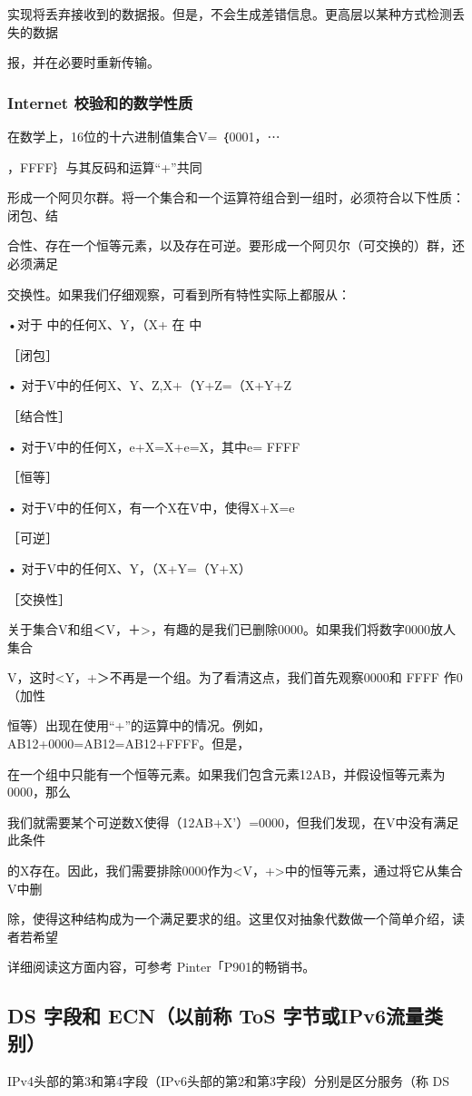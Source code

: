 实现将丢弃接收到的数据报。但是，不会生成差错信息。更高层以某种方式检测丢失的数据

报，并在必要时重新传输。

\subsubsection{Internet 校验和的数学性质}
在数学上，16位的十六进制值集合V= ｛0001，⋯

，FFFF｝与其反码和运算“+”共同

形成一个阿贝尔群。将一个集合和一个运算符组合到一组时，必须符合以下性质：闭包、结

合性、存在一个恒等元素，以及存在可逆。要形成一个阿贝尔（可交换的）群，还必须满足

交换性。如果我们仔细观察，可看到所有特性实际上都服从：

•对于 中的任何X、Y，（X+ 在 中

［闭包］

• 对于V中的任何X、Y、Z,X+（Y+Z=（X+Y+Z

［结合性］

• 对于V中的任何X，e+X=X+e=X，其中e= FFFF

［恒等］

• 对于V中的任何X，有一个X在V中，使得X+X=e

［可逆］

• 对于V中的任何X、Y，（X+Y=（Y+X）

［交换性］

关于集合V和组＜V，＋>，有趣的是我们已删除0000。如果我们将数字0000放人集合

V，这时<Y，+＞不再是一个组。为了看清这点，我们首先观察0000和 FFFF 作0（加性

恒等）出现在使用“+”的运算中的情况。例如，AB12+0000=AB12=AB12+FFFF。但是，

在一个组中只能有一个恒等元素。如果我们包含元素12AB，并假设恒等元素为0000，那么

我们就需要某个可逆数X使得（12AB+X'）=0000，但我们发现，在V中没有满足此条件

的X存在。因此，我们需要排除0000作为<V，+>中的恒等元素，通过将它从集合V中删

除，使得这种结构成为一个满足要求的组。这里仅对抽象代数做一个简单介绍，读者若希望

详细阅读这方面内容，可参考 Pinter「P901的畅销书。

\subsection{DS 字段和 ECN（以前称 ToS 字节或IPv6流量类别）}
IPv4头部的第3和第4字段（IPv6头部的第2和第3字段）分别是区分服务（称 DS

